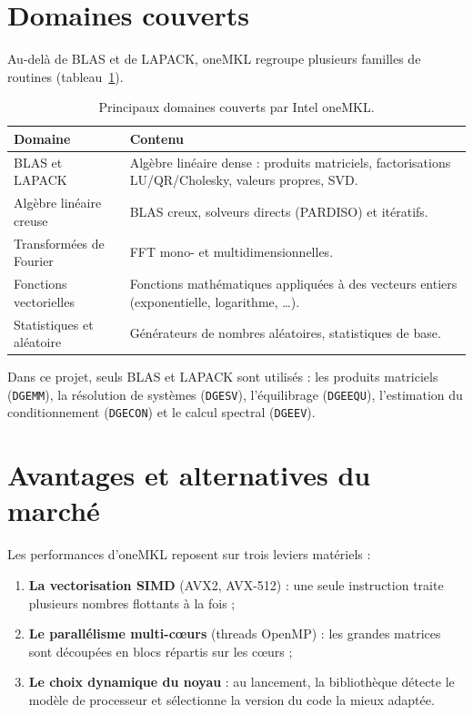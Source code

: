 \documentclass[11pt,a4paper]{report}
\theoremstyle{plain}
\theoremstyle{definition}
\theoremstyle{remark}
\begin{document}
\section{Domaines couverts}

Au-delà de BLAS et de LAPACK, oneMKL regroupe plusieurs familles de routines (tableau~\ref{tab:mkl_domaines}).

\begin{table}[ht]
\centering
\caption{Principaux domaines couverts par Intel oneMKL.}
\label{tab:mkl_domaines}
\begin{tabularx}{\textwidth}{l X}
\toprule
\textbf{Domaine} & \textbf{Contenu} \\
\midrule
BLAS et LAPACK & Algèbre linéaire dense : produits matriciels, factorisations LU/QR/Cholesky, valeurs propres, SVD. \\
Algèbre linéaire creuse & BLAS creux, solveurs directs (PARDISO) et itératifs. \\
Transformées de Fourier & FFT mono- et multidimensionnelles. \\
Fonctions vectorielles & Fonctions mathématiques appliquées à des vecteurs entiers (exponentielle, logarithme, \dots). \\
Statistiques et aléatoire & Générateurs de nombres aléatoires, statistiques de base. \\
\bottomrule
\end{tabularx}
\end{table}

Dans ce projet, seuls BLAS et LAPACK sont utilisés : les produits matriciels (\texttt{DGEMM}), la résolution de systèmes (\texttt{DGESV}), l'équilibrage (\texttt{DGEEQU}), l'estimation du conditionnement (\texttt{DGECON}) et le calcul spectral (\texttt{DGEEV}).

\section{Avantages et alternatives du marché}

Les performances d'oneMKL reposent sur trois leviers matériels :
\begin{enumerate}
    \item \textbf{La vectorisation SIMD} (AVX2, AVX-512) : une seule instruction traite plusieurs nombres flottants à la fois ;
    \item \textbf{Le parallélisme multi-cœurs} (threads OpenMP) : les grandes matrices sont découpées en blocs répartis sur les cœurs ;
    \item \textbf{Le choix dynamique du noyau} : au lancement, la bibliothèque détecte le modèle de processeur et sélectionne la version du code la mieux adaptée.
\end{enumerate}
\end{document}
